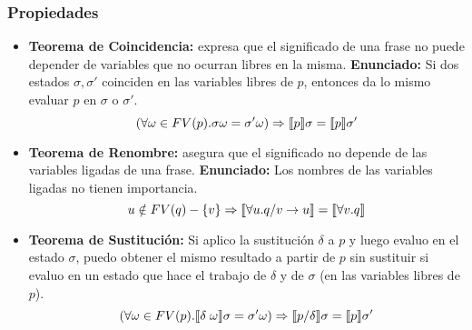   \subsubsection*{Propiedades}
    \begin{itemize}
      \item \textbf{Teorema de Coincidencia:} expresa que el significado de una frase no puede depender de variables que no ocurran libres en la misma.
        \PN \textbf{Enunciado:} Si dos estados $\sigma, \sigma'$ coinciden en las variables libres de $p$, entonces da lo mismo evaluar $p$ en $\sigma$ o $\sigma'$.
        \[
          (\forall \omega \in FV(p) . \sigma \omega = \sigma' \omega) \Rightarrow \llbracket p\rrbracket \sigma = \llbracket p\rrbracket \sigma'
        \] 
      \item \textbf{Teorema de Renombre:} asegura que el significado no depende de las variables ligadas de una frase.
        \PN \textbf{Enunciado:} Los nombres de las variables ligadas no tienen importancia.
        \[
          u \notin FV(q) - \{v\} \Rightarrow \llbracket\forall u . q/v \rightarrow u\rrbracket = \llbracket\forall v . q\rrbracket
        \]
      \item \textbf{Teorema de Sustitución:} Si aplico la sustitución $\delta$ a $p$ y luego evaluo en el estado $\sigma$, puedo obtener el mismo resultado a partir de $p$ sin sustituir si evaluo en un estado que hace el trabajo de $\delta$ y de $\sigma$ (en las variables libres de $p$).
        \[
          (\forall \omega \in FV(p) . \llbracket\delta \; \omega\rrbracket \sigma = \sigma' \omega) \Rightarrow \llbracket p/\delta\rrbracket \sigma = \llbracket p\rrbracket \sigma'
        \]
    \end{itemize}